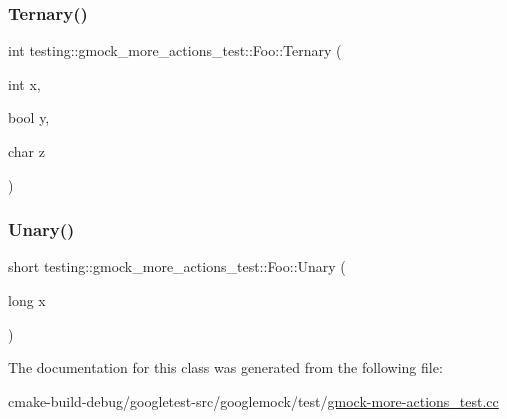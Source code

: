 \subsubsection{\texorpdfstring{Ternary()}{Ternary()}}
{\footnotesize\ttfamily int testing\+::gmock\+\_\+more\+\_\+actions\+\_\+test\+::\+Foo\+::\+Ternary (\begin{DoxyParamCaption}\item[{int}]{x,  }\item[{bool}]{y,  }\item[{char}]{z }\end{DoxyParamCaption})\hspace{0.3cm}{\ttfamily [inline]}}

\mbox{\label{classtesting_1_1gmock__more__actions__test_1_1Foo_a68d2b46d6cc7d51979b0254940af6090}} 
\subsubsection{\texorpdfstring{Unary()}{Unary()}}
{\footnotesize\ttfamily short testing\+::gmock\+\_\+more\+\_\+actions\+\_\+test\+::\+Foo\+::\+Unary (\begin{DoxyParamCaption}\item[{long}]{x }\end{DoxyParamCaption})\hspace{0.3cm}{\ttfamily [inline]}}



The documentation for this class was generated from the following file\+:\begin{DoxyCompactItemize}
\item 
cmake-\/build-\/debug/googletest-\/src/googlemock/test/\mbox{\hyperlink{gmock-more-actions__test_8cc}{gmock-\/more-\/actions\+\_\+test.\+cc}}\end{DoxyCompactItemize}

